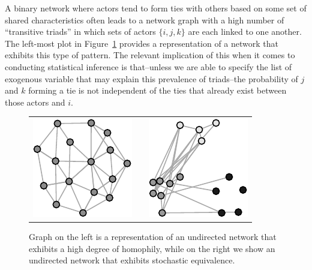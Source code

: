 \documentclass[12pt,pdflatex]{elsarticle}
\begin{document}
A binary network where actors tend to form ties with others based on some set of shared characteristics often leads to a network graph with a high number of ``transitive triads'' in which  sets of actors $\{i,j,k\}$ are each linked to one another. The left-most plot in Figure~\ref{fig:homphStochEquivNet} provides a representation of a network that exhibits this type of pattern. The relevant implication of this when it comes to conducting statistical inference is that--unless we are able to specify the list of exogenous variable that may explain this prevalence of triads--the probability of $j$ and $k$ forming a tie is not independent of the ties that already exist between those actors and $i$.

\begin{figure}[ht]
	\centering
	\caption{Graph on the left is a representation of an undirected network that exhibits a high degree of homophily, while on the right we show an undirected network that exhibits stochastic equivalence.}	
	\begin{tabular}{lcr}
	\includegraphics[width=.33\textwidth]{homophNet} & \hspace{2cm} &
	\includegraphics[width=.33\textwidth]{stochEquivNet}	
	\end{tabular}
	\label{fig:homphStochEquivNet}
\end{figure}
\end{document}
